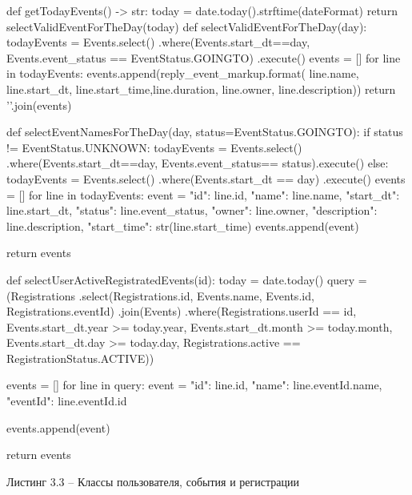 \documentclass[12pt,a4paper,oneside]{report}
\begin{document}
\begin{python}
def getTodayEvents() -> str:
    today = date.today().strftime(dateFormat)
    return selectValidEventForTheDay(today)
def selectValidEventForTheDay(day):
    todayEvents = Events.select()
                         .where(Events.start_dt==day,                   Events.event_status == EventStatus.GOINGTO)
                         .execute()
    events = []
    for line in todayEvents:
        events.append(reply_event_markup.format(
                     line.name, line.start_dt,
                     line.start_time,line.duration,
                     line.owner, line.description))
    return '\n'.join(events)

def selectEventNamesForTheDay(day, status=EventStatus.GOINGTO):
    if status != EventStatus.UNKNOWN:
        todayEvents = Events.select()
            .where(Events.start_dt==day,
                   Events.event_status== status).execute()
    else:
        todayEvents = Events.select()
                     .where(Events.start_dt == day)
                     .execute()
    events = []
    for line in todayEvents:
        event = {"id": line.id,
                 "name": line.name,
                 "start_dt": line.start_dt,
                 "status": line.event_status,
                 "owner": line.owner,
                 "description": line.description,
                 "start_time": str(line.start_time)}
        events.append(event)

    return events

def selectUserActiveRegistratedEvents(id):
    today = date.today()
    query = (Registrations
             .select(Registrations.id, Events.name, Events.id, Registrations.eventId)
             .join(Events)
             .where(Registrations.userId == id,
                    Events.start_dt.year >= today.year,
                    Events.start_dt.month >= today.month,
                    Events.start_dt.day >= today.day,
                    Registrations.active == RegistrationStatus.ACTIVE))

    events = []
    for line in query:
        event = {"id": line.id,
                 "name": line.eventId.name,
                 "eventId": line.eventId.id
                 }

        events.append(event)

    return events

\end{python}

\begin{center}
    Листинг 3.3 – Классы пользователя, события и регистрации
\end{center}
\end{document}
